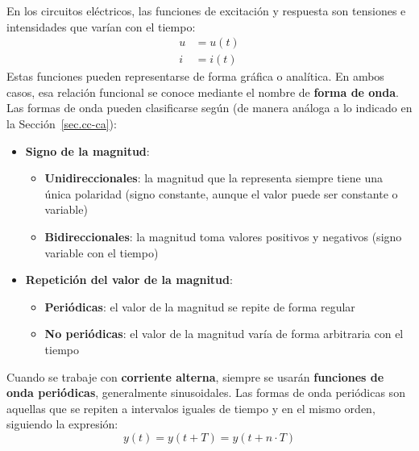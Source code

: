 \documentclass[11pt]{book} %
\begin{document}
 		En los circuitos eléctricos, las funciones de excitación y respuesta son tensiones
	e intensidades que varían con el tiempo:
	\begin{align*}
		u&=u(t)\\
		i&=i(t)
	\end{align*}
	Estas funciones pueden representarse de forma gráfica o analítica. En ambos
	casos, esa relación funcional se conoce mediante el nombre de \textbf{forma de onda}. Las formas de onda pueden clasificarse según (de manera análoga a lo indicado en la Sección~\ref{sec.cc-ca}):
	\begin{itemize}
		\item \textbf{Signo de la magnitud}:
		\begin{itemize}
			\item \textbf{Unidireccionales}: la magnitud que la representa siempre tiene una única polaridad (signo constante, aunque el valor puede ser constante o variable)
			\item \textbf{Bidireccionales}: la magnitud toma valores positivos y negativos (signo variable con el tiempo)
		\end{itemize}
		\item \textbf{Repetición del valor de la magnitud}:
		\begin{itemize}
			\item \textbf{Periódicas}: el valor de la magnitud se repite de forma regular
			\item \textbf{No periódicas}: el valor de la magnitud varía de forma arbitraria con el tiempo
		\end{itemize}
	\end{itemize}

	Cuando se trabaje con \textbf{corriente alterna}, siempre se usarán \textbf{funciones de onda periódicas}, generalmente sinusoidales. Las formas de onda periódicas son aquellas que se repiten a intervalos iguales de tiempo y en el mismo orden, siguiendo la expresión:
	\begin{equation*}
		y(t)=y(t+T)=y(t+n\cdot T)
	\end{equation*}
	
\end{document}
